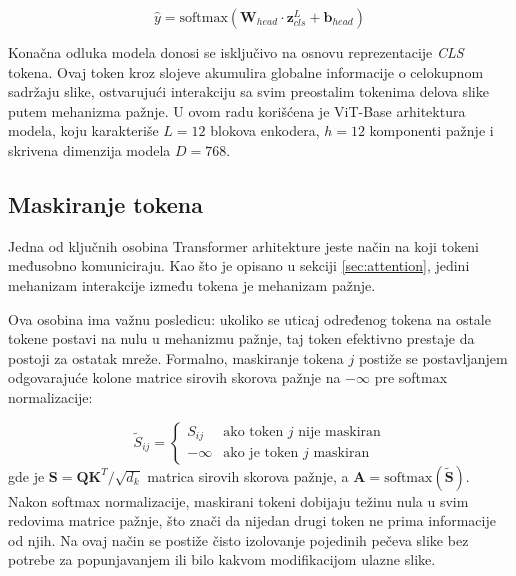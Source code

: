 \begin{equation}
    \hat{y} = \text{softmax}(\mathbf{W}_{head} \cdot \mathbf{z}^L_{cls} + \mathbf{b}_{head})
\end{equation}

Konačna odluka modela donosi se isključivo na osnovu reprezentacije \textit{CLS} tokena. Ovaj token kroz slojeve akumulira globalne informacije o celokupnom sadržaju slike, ostvarujući interakciju sa svim preostalim tokenima delova slike putem mehanizma pažnje. U ovom radu korišćena je ViT-Base arhitektura modela, koju karakteriše $L=12$ blokova enkodera, $h=12$ komponenti pažnje i skrivena dimenzija modela $D=768$.

\subsection{Maskiranje tokena}
\label{sec:masking}
Jedna od ključnih osobina Transformer arhitekture jeste način na koji 
tokeni međusobno komuniciraju. Kao što je opisano u sekciji \ref{sec:attention}, 
jedini mehanizam interakcije između tokena je mehanizam pažnje.

Ova osobina ima važnu posledicu: ukoliko se uticaj određenog tokena na 
ostale tokene postavi na nulu u mehanizmu pažnje, taj token efektivno prestaje 
da postoji za ostatak mreže. Formalno, maskiranje tokena $j$ postiže se 
postavljanjem odgovarajuće kolone matrice sirovih skorova pažnje na $-\infty$ 
pre softmax normalizacije:

\begin{equation}
    \tilde{S}_{ij} = 
    \begin{cases}
        S_{ij} & \text{ako token } j \text{ nije maskiran} \\
        -\infty & \text{ako je token } j \text{ maskiran}
    \end{cases}
\end{equation}
gde je $\mathbf{S} = \mathbf{Q}\mathbf{K}^T / \sqrt{d_k}$ matrica sirovih 
skorova pažnje, a $\mathbf{A} = \text{softmax}(\tilde{\mathbf{S}})$. Nakon 
softmax normalizacije, maskirani tokeni dobijaju težinu nula u svim redovima 
matrice pažnje, što znači da nijedan drugi token ne prima informacije od njih. 
Na ovaj način se postiže čisto izolovanje pojedinih pečeva slike bez potrebe 
za popunjavanjem ili bilo kakvom modifikacijom ulazne slike.